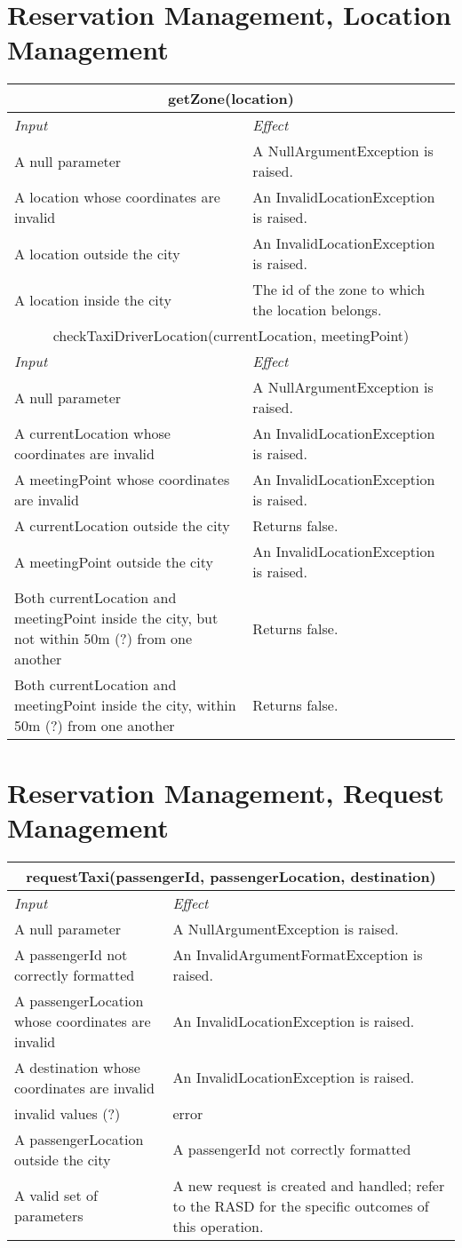 \documentclass[11pt,oneside,a4paper]{report}
\newcommand{\method}[1]{\multicolumn{2}{|c|}{{#1}}\\\hline
	\textit{Input} & \textit{Effect} \\\hline}
\begin{document}
\section{Reservation Management, Location Management}
\begin{tabular}{p{5cm}|p{6cm}}
\hline
	\method{getZone(location)}
	A null parameter &
	A NullArgumentException is raised.\\\hline
	A location whose coordinates are invalid &
	An InvalidLocationException is raised. \\\hline
	A location outside the city &
	An InvalidLocationException is raised. \\\hline
	A location inside the city &
	The id of the zone to which the location belongs. \\\hline\hline
		
	\method{	checkTaxiDriverLocation(currentLocation, meetingPoint)}
	A null parameter &
	A NullArgumentException is raised. \\\hline
	A currentLocation whose coordinates are invalid &
	An InvalidLocationException is raised. \\\hline
	A meetingPoint whose coordinates are invalid &
	An InvalidLocationException is raised. \\\hline
	A currentLocation outside the city &
	Returns false. \\\hline
	A meetingPoint outside the city & 
	An InvalidLocationException is raised. \\\hline
	Both currentLocation and meetingPoint inside the city, but not within 50m (?) from one another &
	Returns false. \\\hline
	Both currentLocation and meetingPoint inside the city, within 50m (?) from one another &
	Returns false. \\\hline
\end{tabular}


\section{Reservation Management, Request Management}
\begin{tabular}{p{5cm}|p{6cm}}
\hline
	\method{requestTaxi(passengerId, passengerLocation, destination)}
	A null parameter &
	A NullArgumentException is raised.\\\hline
	A passengerId not correctly formatted &
	An InvalidArgumentFormatException is raised. \\\hline
	A passengerLocation whose coordinates are invalid &
	An InvalidLocationException is raised. \\\hline
	A destination whose coordinates are invalid &
	An InvalidLocationException is raised. \\\hline
	invalid values (?) &
	error \\\hline
	A passengerLocation outside the city &
	A passengerId not correctly formatted \\\hline
	A valid set of parameters &
	A new request is created and handled; refer to the RASD for the specific outcomes of this operation. \\\hline\hline
\end{tabular}
\end{document}
